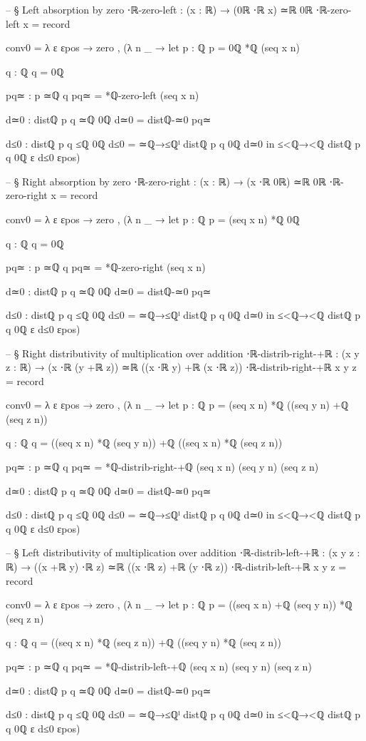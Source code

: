 \documentclass[11pt,a4paper]{book}
\begin{document}
\begin{code}
-- § Left absorption by zero
⋅ℝ-zero-left : (x : ℝ) → (0ℝ ⋅ℝ x) ≃ℝ 0ℝ
⋅ℝ-zero-left x = record
  { conv0 = λ ε εpos →
      zero , (λ n _ →
        let
          p : ℚ
          p = 0ℚ *ℚ (seq x n)

          q : ℚ
          q = 0ℚ

          pq≃ : p ≃ℚ q
          pq≃ = *ℚ-zero-left (seq x n)

          d≃0 : distℚ p q ≃ℚ 0ℚ
          d≃0 = distℚ-≃0 pq≃

          d≤0 : distℚ p q ≤ℚ 0ℚ
          d≤0 = ≃ℚ→≤ℚˡ {distℚ p q} {0ℚ} d≃0
        in
        ≤<ℚ→<ℚ {distℚ p q} {0ℚ} {ε} d≤0 εpos)
  }

-- § Right absorption by zero
⋅ℝ-zero-right : (x : ℝ) → (x ⋅ℝ 0ℝ) ≃ℝ 0ℝ
⋅ℝ-zero-right x = record
  { conv0 = λ ε εpos →
      zero , (λ n _ →
        let
          p : ℚ
          p = (seq x n) *ℚ 0ℚ

          q : ℚ
          q = 0ℚ

          pq≃ : p ≃ℚ q
          pq≃ = *ℚ-zero-right (seq x n)

          d≃0 : distℚ p q ≃ℚ 0ℚ
          d≃0 = distℚ-≃0 pq≃

          d≤0 : distℚ p q ≤ℚ 0ℚ
          d≤0 = ≃ℚ→≤ℚˡ {distℚ p q} {0ℚ} d≃0
        in
        ≤<ℚ→<ℚ {distℚ p q} {0ℚ} {ε} d≤0 εpos)
  }

-- § Right distributivity of multiplication over addition
⋅ℝ-distrib-right-+ℝ : (x y z : ℝ) → (x ⋅ℝ (y +ℝ z)) ≃ℝ ((x ⋅ℝ y) +ℝ (x ⋅ℝ z))
⋅ℝ-distrib-right-+ℝ x y z = record
  { conv0 = λ ε εpos →
      zero , (λ n _ →
        let
          p : ℚ
          p = (seq x n) *ℚ ((seq y n) +ℚ (seq z n))

          q : ℚ
          q = ((seq x n) *ℚ (seq y n)) +ℚ ((seq x n) *ℚ (seq z n))

          pq≃ : p ≃ℚ q
          pq≃ = *ℚ-distrib-right-+ℚ (seq x n) (seq y n) (seq z n)

          d≃0 : distℚ p q ≃ℚ 0ℚ
          d≃0 = distℚ-≃0 pq≃

          d≤0 : distℚ p q ≤ℚ 0ℚ
          d≤0 = ≃ℚ→≤ℚˡ {distℚ p q} {0ℚ} d≃0
        in
        ≤<ℚ→<ℚ {distℚ p q} {0ℚ} {ε} d≤0 εpos)
  }

-- § Left distributivity of multiplication over addition
⋅ℝ-distrib-left-+ℝ : (x y z : ℝ) → ((x +ℝ y) ⋅ℝ z) ≃ℝ ((x ⋅ℝ z) +ℝ (y ⋅ℝ z))
⋅ℝ-distrib-left-+ℝ x y z = record
  { conv0 = λ ε εpos →
      zero , (λ n _ →
        let
          p : ℚ
          p = ((seq x n) +ℚ (seq y n)) *ℚ (seq z n)

          q : ℚ
          q = ((seq x n) *ℚ (seq z n)) +ℚ ((seq y n) *ℚ (seq z n))

          pq≃ : p ≃ℚ q
          pq≃ = *ℚ-distrib-left-+ℚ (seq x n) (seq y n) (seq z n)

          d≃0 : distℚ p q ≃ℚ 0ℚ
          d≃0 = distℚ-≃0 pq≃

          d≤0 : distℚ p q ≤ℚ 0ℚ
          d≤0 = ≃ℚ→≤ℚˡ {distℚ p q} {0ℚ} d≃0
        in
        ≤<ℚ→<ℚ {distℚ p q} {0ℚ} {ε} d≤0 εpos)
  }
\end{code}
\end{document}
